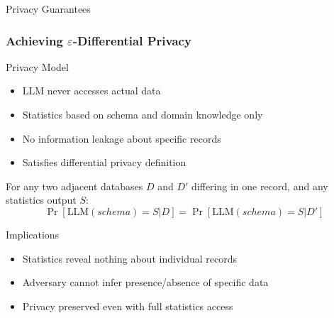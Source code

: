 \documentclass[smaller]{beamer}
\begin{document}
\begin{frame}{Privacy Guarantees}
\frametitle{Achieving $\varepsilon$-Differential Privacy}

\begin{block}{Privacy Model}
\begin{itemize}
    \item LLM never accesses actual data
    \item Statistics based on schema and domain knowledge only
    \item No information leakage about specific records
    \item Satisfies differential privacy definition
\end{itemize}
\end{block}

\begin{theorem}
For any two adjacent databases $D$ and $D'$ differing in one record, and any statistics output $S$:
$$\Pr[\text{LLM}(schema) = S | D] = \Pr[\text{LLM}(schema) = S | D']$$
\end{theorem}

\begin{alertblock}{Implications}
\begin{itemize}
    \item Statistics reveal nothing about individual records
    \item Adversary cannot infer presence/absence of specific data
    \item Privacy preserved even with full statistics access
\end{itemize}
\end{alertblock}

\end{frame}
\end{document}
